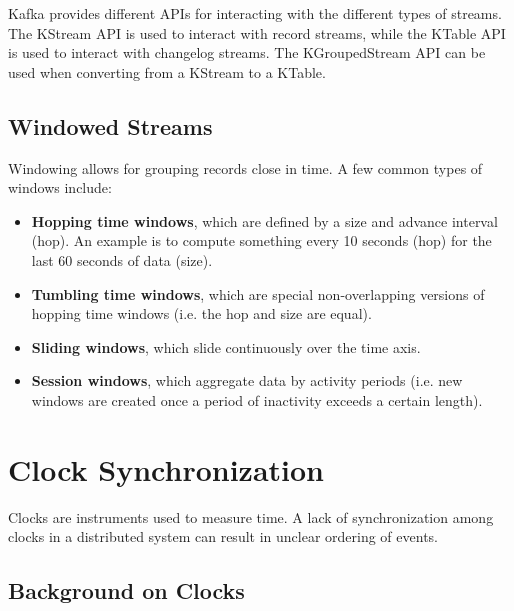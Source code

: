 \documentclass[12pt,titlepage]{article}
\let\stdsection\section
\renewcommand\section{\clearpage\stdsection}
\begin{document}
      Kafka provides different APIs for interacting with the different types of streams. The KStream API is used to interact with record streams, while
      the KTable API is used to interact with changelog streams. The KGroupedStream API can be used when converting from a KStream to a KTable.

    \subsection{Windowed Streams}
      Windowing allows for grouping records close in time. A few common types of windows include:
      \begin{itemize}
        \item \textbf{Hopping time windows}, which are defined by a size and advance interval (hop). An example is to compute something every 10 seconds (hop)
          for the last 60 seconds of data (size).
        \item \textbf{Tumbling time windows}, which are special non-overlapping versions of hopping time windows (i.e. the hop and size are equal).
        \item \textbf{Sliding windows}, which slide continuously over the time axis.
        \item \textbf{Session windows}, which aggregate data by activity periods (i.e. new windows are created once a period of inactivity exceeds a certain length).
      \end{itemize}

  \section{Clock Synchronization}
    Clocks are instruments used to measure time. A lack of synchronization among clocks in a distributed system can result in unclear ordering of events.

    \subsection{Background on Clocks}
\end{document}
